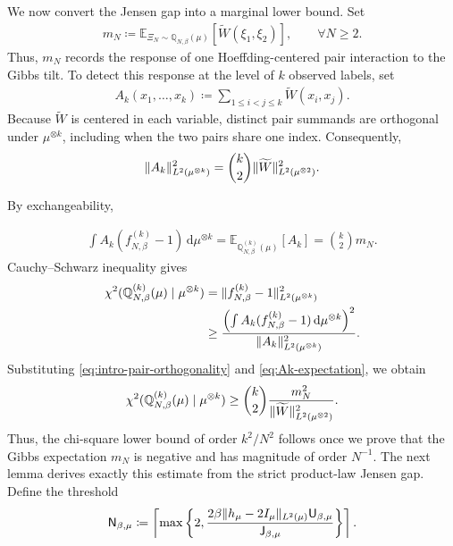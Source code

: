 \documentclass[11pt,reqno]{amsart}
\numberwithin{equation}{section}
\theoremstyle{plain}
\theoremstyle{remark}
\DeclarePairedDelimiter{\pa}{\lparen}{\rparen}
\DeclarePairedDelimiter{\norm}{\lVert}{\rVert}
\newcommand{\md}{\mathrm{d}}
\newcommand{\E}{{\mathbb{E}}}
\newcommand{\Q}{{\mathbb{Q}}}
\newcommand{\tl}{\widetilde}
\newcommand{\be}{\beta}
\newcommand{\Chi}{\chi^2}
\begin{document}
We now convert the Jensen gap into a marginal lower bound.  Set
\begin{align}\label{eq:mN-def}
 m_N\coloneqq \E_{\Xi_N\sim\Q_{N,\be}(\mu)}
 \left[\tl W(\xi_1,\xi_2)\right],
 \qquad \forall N\ge2.
\end{align}
Thus, \(m_N\) records the response of one Hoeffding-centered pair interaction to the Gibbs tilt.  To detect this response at the level of $k$ observed labels, set
\begin{align}\label{eq:intro-centered-pair-statistic}
 A_k(x_1,\ldots,x_k)
 \coloneqq \sum_{1\le i<j\le k}\tl W(x_i,x_j).
\end{align}
Because \(\tl W\) is centered in each variable, distinct pair summands are orthogonal under \(\mu^{\otimes k}\), including when the two pairs share one index.  Consequently,
\begin{align}\label{eq:intro-pair-orthogonality}
 \norm{A_k}_{L^2(\mu^{\otimes k})}^2
 =\binom{k}{2}\norm{\tl W}_{L^2(\mu^{\otimes2})}^2.
\end{align}

By exchangeability,

\begin{align}\label{eq:Ak-expectation}
 \int A_k(f_{N,\be}^{(k)}-1)\,\md\mu^{\otimes k}
 =\E_{\Q_{N,\be}^{(k)}(\mu)}\left[A_k\right]
 =\binom{k}{2}m_N.
\end{align}
Cauchy--Schwarz inequality gives
\begin{align}
 \Chi\pa{\Q_{N,\be}^{(k)}(\mu)\mid\mu^{\otimes k}}
 &=\norm{f_{N,\be}^{(k)}-1}_{L^2(\mu^{\otimes k})}^2\notag\\
 &\ge
 \frac{\pa*{\int A_k(f_{N,\be}^{(k)}-1)\,\md\mu^{\otimes k}}^2}
 {\norm{A_k}_{L^2(\mu^{\otimes k})}^2}.
 \label{eq:chi2-duality-test}
\end{align}
Substituting \eqref{eq:intro-pair-orthogonality} and \eqref{eq:Ak-expectation}, we obtain
\begin{align}\label{eq:chi-lower-from-mN}
 \Chi\pa{\Q_{N,\be}^{(k)}(\mu)\mid\mu^{\otimes k}}
 \ge \binom{k}{2}
 \frac{m_N^2}{\norm{\tl W}_{L^2(\mu^{\otimes2})}^2}.
\end{align}
Thus, the chi-square lower bound of order \(k^2/N^2\) follows once we prove
that the Gibbs expectation \(m_N\) is negative and has magnitude of order
\(N^{-1}\).  The next lemma derives exactly this estimate from the strict
product-law Jensen gap.  Define the threshold
\begin{align}\label{eq:N-beta-mu-threshold}
 \mathsf N_{\be,\mu}
 \coloneqq
 \left\lceil \max\left\{2,
 \frac{2\be\norm{h_\mu-2I_\mu}_{L^2(\mu)}
       \mathsf U_{\be,\mu}}{\mathsf J_{\be,\mu}}\right\}\right\rceil .
\end{align}
\end{document}
